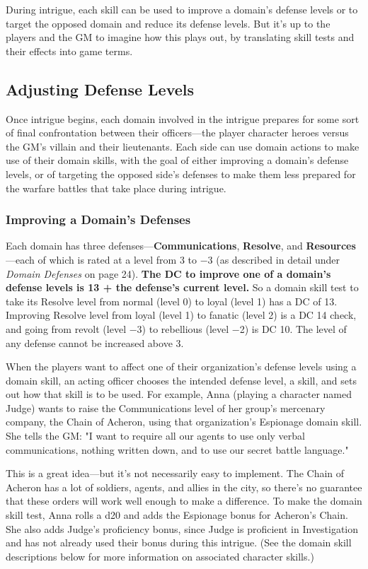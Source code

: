 \documentclass[10pt,a4paper,twoside,bg=print,twocolumn,openany,nodeprecatedcode]{dndbook}
\begin{document}
During intrigue, each skill can be used to improve a domain's defense levels or to target the opposed domain and reduce its defense levels. But it's up to the players and the GM to imagine how this plays out, by translating skill tests and their effects into game terms.

\subsection{Adjusting Defense Levels}
Once intrigue begins, each domain involved in the intrigue prepares for some sort of final confrontation between their officers—the player character heroes versus the GM's villain and their lieutenants. Each side can use domain actions to make use of their domain skills, with the goal of either improving a domain's defense levels, or of targeting the opposed side's defenses to make them less prepared for the warfare battles that take place during intrigue.

\subsubsection{Improving a Domain's Defenses}
Each domain has three defenses—\textbf{Communications}, \textbf{Resolve}, and \textbf{Resources}—each of which is rated at a level from 3 to −3 (as described in detail under \textit{Domain Defenses} on page 24). \textbf{The DC to improve one of a domain's defense levels is 13 + the defense's current level.} So a domain skill test to take its Resolve level from normal (level 0) to loyal (level 1) has a DC of 13. Improving Resolve level from loyal (level 1) to fanatic (level 2) is a DC 14 check, and going from revolt (level −3) to rebellious (level −2) is DC 10. The level of any defense cannot be increased above 3.

When the players want to affect one of their organization's defense levels using a domain skill, an acting officer chooses the intended defense level, a skill, and sets out how that skill is to be used. For example, Anna (playing a character named Judge) wants to raise the Communications level of her group's mercenary company, the Chain of Acheron, using that organization's Espionage domain skill. She tells the GM: "I want to require all our agents to use only verbal communications, nothing written down, and to use our secret battle language."

This is a great idea—but it's not necessarily easy to implement. The Chain of Acheron has a lot of soldiers, agents, and allies in the city, so there's no guarantee that these orders will work well enough to make a difference. To make the domain skill test, Anna rolls a d20 and adds the Espionage bonus for Acheron's Chain. She also adds Judge's proficiency bonus, since Judge is proficient in Investigation and has not already used their bonus during this intrigue. (See the domain skill descriptions below for more information on associated character skills.)
\end{document}
